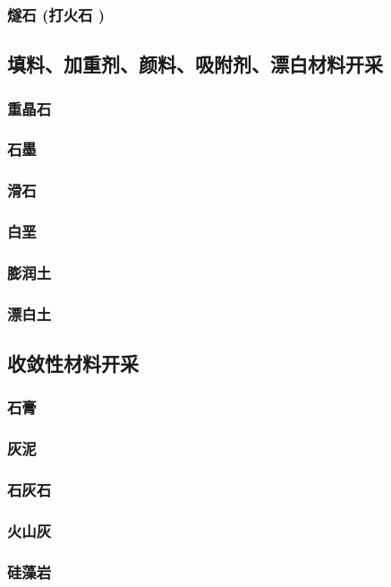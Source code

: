 \documentclass[UTF8]{../../ApplicationUniverse}
\begin{document}
        \subsubsection{燧石 (打火石 )}
    \subsection{填料、加重剂、颜料、吸附剂、漂白材料开采}
        \subsubsection{重晶石}
        \subsubsection{石墨}
        \subsubsection{滑石}
        \subsubsection{白垩}
        \subsubsection{膨润土}
        \subsubsection{漂白土}
    \subsection{收敛性材料开采}
        \subsubsection{石膏}
        \subsubsection{灰泥}
        \subsubsection{石灰石}
        \subsubsection{火山灰}
        \subsubsection{硅藻岩}
\end{document}

